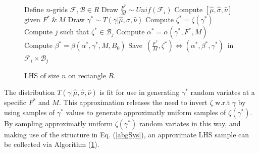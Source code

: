 
%
\clearpage
%
\begin{figure}
	\vspace{-1cm}
	\begin{minipage}{0.5\textwidth}
      		\begin{algorithm}[H]
			\caption{LHS of size $n$ on rectangle $R$.}
			\label{lhsAlg}
			\begin{algorithmic}[1]
			\State Define $n$-grids $\mathcal{F}, \mathcal{B}\in R$
			\State Draw $\frac{F^*}{M} \sim Unif(\mathcal{F}_i)$
			\State Compute $[\hat\mu, \hat\sigma, \hat\nu]$ given $F^*~\&~M$
				\State Draw $\gamma^* \sim T(\gamma|\hat\mu, \hat\sigma, \hat\nu)$
				\State Compute $\zeta^* = \zeta(\gamma^*)$
				\State Compute $j$ such that $\zeta^*\in\mathcal{B}_j$
			\EndWhile
			\State Compute $\alpha^* = \alpha(\gamma^*, F^*, M)$ 
			\State Compute $\beta^* = \beta(\alpha^*, \gamma^*, M, B_0)$	
			\State \mbox{Save $(\frac{F^*}{M}, \zeta^*)\Leftrightarrow(\alpha^*, \beta^*, \gamma^*)$ in $\mathcal{F}_i\times\mathcal{B}_j$} 
			\EndFor
			\EndProcedure
			\end{algorithmic}
		\end{algorithm}
	\end{minipage}
\end{figure}


The distribution $T(\gamma|\hat\mu, \hat\sigma, \hat\nu)$ is fit for use in 
generating $\gamma^*$ random variates at a specific $F^*$ and $M$. This approximation 
releases the need to invert $\zeta$ w.r.t $\gamma$ by using samples of $\gamma^*$ values to 
generate approximatly uniform samples of $\zeta(\gamma^*)$. By sampling approximatly 
uniform $\zeta(\gamma^*)$ random variates in this way, and making use of the structure in Eq. (\ref{abgSys}), 
an approximate LHS sample can be collected via Algorithm (\ref{lhsAlg}). %


